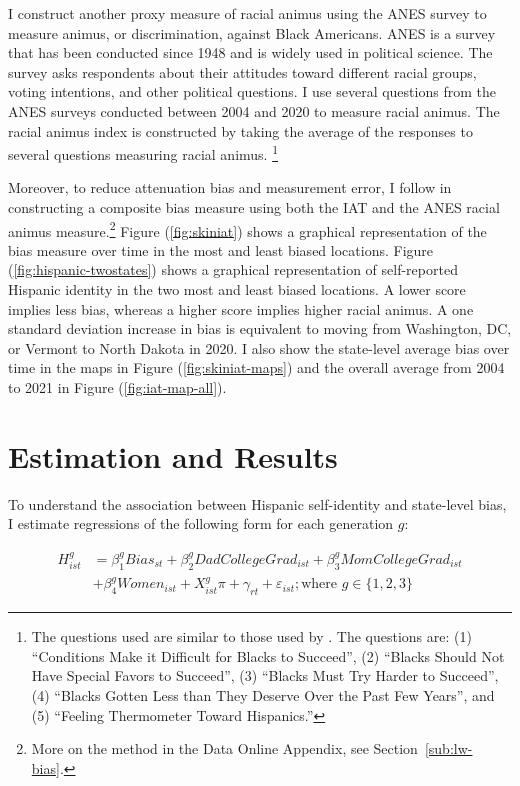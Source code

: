 \documentclass[12pt,english]{article}
\begin{document}
I construct another proxy measure of racial animus using the ANES survey \autocite{anes2021} to measure animus, or discrimination, against Black Americans. ANES is a survey that has been conducted since 1948 and is widely used in political science. The survey asks respondents about their attitudes toward different racial groups, voting intentions, and other political questions. I use several questions from the ANES surveys conducted between 2004 and 2020 to measure racial animus. The racial animus index is constructed by taking the average of the responses to several questions measuring racial animus. \footnote{The questions used are similar to those used by \textcite{charlesPrejudiceWagesEmpirical2008}. The questions are: (1) ``Conditions Make it Difficult for Blacks to Succeed'', (2) ``Blacks Should Not Have Special Favors to Succeed'', (3) ``Blacks Must Try Harder to Succeed'', (4) ``Blacks Gotten Less than They Deserve Over the Past Few Years'', and (5) ``Feeling Thermometer Toward Hispanics.''}

Moreover, to reduce attenuation bias and measurement error, I follow \textcite{lubotskyInterpretationRegressionsMultiple2006} in constructing a composite bias measure using both the IAT and the ANES racial animus measure.\footnote{More on the method in the Data Online Appendix, see Section~\ref{sub:lw-bias}.} Figure (\ref{fig:skiniat}) shows a graphical representation of the bias measure over time in the most and least biased locations. Figure (\ref{fig:hispanic-twostates}) shows a graphical representation of self-reported Hispanic identity in the two most and least biased locations. A lower score implies less bias, whereas a higher score implies higher racial animus. A one standard deviation increase in bias is equivalent to moving from Washington, DC, or Vermont to North Dakota in 2020. I also show the state-level average bias over time in the maps in Figure (\ref{fig:skiniat-maps}) and the overall average from 2004 to 2021 in Figure (\ref{fig:iat-map-all}).
\section{Estimation and Results}\label{sec:empstrat}

To understand the association between Hispanic self-identity and state-level bias, I estimate regressions of the following form for each generation $g$:
 
\begin{align}
H_{ist}^g &= \beta_1^g Bias_{st} + \beta_2^g DadCollegeGrad_{ist} + \beta_3^g MomCollegeGrad_{ist} \nonumber \\ 
            &+ \beta_4^g Women_{ist} + X_{ist}^g\pi + \gamma_{rt} 
           + \varepsilon_{ist}; 
           \text{where } g \in \{1,2,3\} \label{eq:identity_reg_bias}
\end{align}
\end{document}
